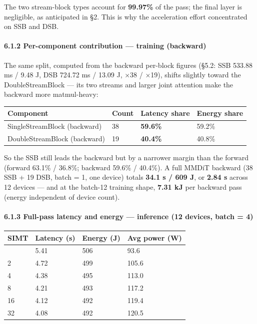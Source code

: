 \documentclass[
  10pt,
]{article}
\newcounter{none} %
\begin{document}
The two stream-block types account for \textbf{99.97\%} of the pass; the
final layer is negligible, as anticipated in §2. This is why the
acceleration effort concentrated on SSB and DSB.

\paragraph{6.1.2 Per-component contribution --- training
(backward)}\label{per-component-contribution-training}

The same split, computed from the backward per-block figures (§5.2:
SSB 533.88 ms / 9.48 J, DSB 724.72 ms / 13.09 J, ×38 / ×19), shifts
slightly toward the DoubleStreamBlock --- its two streams and larger
joint attention make the backward more matmul-heavy:

{\def\LTcaptype{none} %
\begin{longtable}[]{@{}llll@{}}
\toprule\noalign{}
Component & Count & Latency share & Energy share \\
\midrule\noalign{}
\endhead
\bottomrule\noalign{}
\endlastfoot
SingleStreamBlock (backward) & 38 & \textbf{59.6\%} & 59.2\% \\
DoubleStreamBlock (backward) & 19 & \textbf{40.4\%} & 40.8\% \\
\end{longtable}
}

So the SSB still leads the backward but by a narrower margin than the
forward (forward 63.1\% / 36.8\%; backward 59.6\% / 40.4\%). A full MMDiT
backward (38 SSB + 19 DSB, batch = 1, one device) totals \textbf{34.1 s /
609 J}, or \textbf{2.84 s} across 12 devices --- and at the batch-12
training shape, \textbf{7.31 kJ} per backward pass (energy independent of
device count).

\paragraph{6.1.3 Full-pass latency and energy --- inference (12 devices,
batch = 4)}\label{full-pass-latency-and-energy-12-devices-batch-4}

{\def\LTcaptype{none} %
\begin{longtable}[]{@{}llll@{}}
\toprule\noalign{}
SIMT & Latency (s) & Energy (J) & Avg power (W) \\
\midrule\noalign{}
\endhead
\bottomrule\noalign{}
\endlastfoot
1 & 5.41 & 506 & 93.6 \\
2 & 4.72 & 499 & 105.6 \\
4 & 4.38 & 495 & 113.0 \\
8 & 4.21 & 493 & 117.2 \\
16 & 4.12 & 492 & 119.4 \\
32 & 4.08 & 492 & 120.5 \\
\end{longtable}
}
\end{document}
